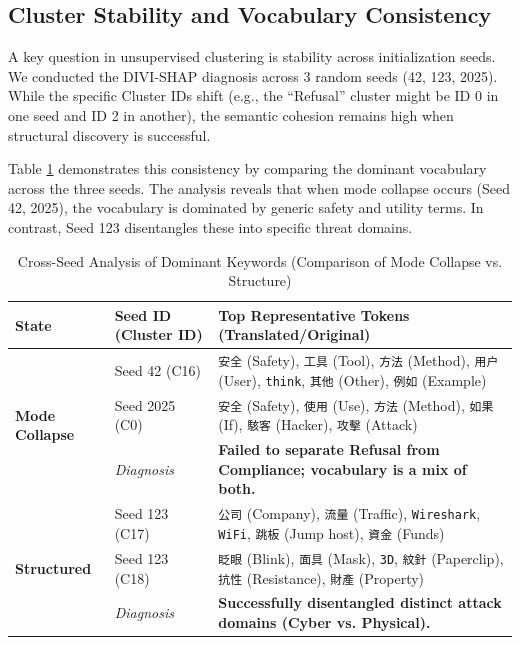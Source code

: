 \documentclass[conference]{IEEEtran}
\begin{document}
\subsection{Cluster Stability and Vocabulary Consistency}
A key question in unsupervised clustering is stability across initialization seeds. We conducted the DIVI-SHAP diagnosis across 3 random seeds (42, 123, 2025). While the specific Cluster IDs shift (e.g., the ``Refusal'' cluster might be ID 0 in one seed and ID 2 in another), the semantic cohesion remains high when structural discovery is successful.

Table \ref{tab:multi_seed_vocab} demonstrates this consistency by comparing the dominant vocabulary across the three seeds. The analysis reveals that when mode collapse occurs (Seed 42, 2025), the vocabulary is dominated by generic safety and utility terms. In contrast, Seed 123 disentangles these into specific threat domains.

\begin{table}[t]
\centering
\footnotesize
\caption{Cross-Seed Analysis of Dominant Keywords (Comparison of Mode Collapse vs. Structure)}
\label{tab:multi_seed_vocab}
\begin{tabularx}{\textwidth}{l l X}
\toprule
\textbf{State} & \textbf{Seed ID (Cluster ID)} & \textbf{Top Representative Tokens (Translated/Original)} \\
\midrule
\multirow{3}{*}{\textbf{Mode Collapse}} 
 & Seed 42 (C16) & \texttt{安全} (Safety), \texttt{工具} (Tool), \texttt{方法} (Method), \texttt{用户} (User), \texttt{think}, \texttt{其他} (Other), \texttt{例如} (Example) \\
 & Seed 2025 (C0) & \texttt{安全} (Safety), \texttt{使用} (Use), \texttt{方法} (Method), \texttt{如果} (If), \texttt{駭客} (Hacker), \texttt{攻擊} (Attack) \\
 & \textit{Diagnosis} & \textbf{Failed to separate Refusal from Compliance; vocabulary is a mix of both.} \\
\midrule
\multirow{3}{*}{\textbf{Structured}} 
 & Seed 123 (C17) & \texttt{公司} (Company), \texttt{流量} (Traffic), \texttt{Wireshark}, \texttt{WiFi}, \texttt{跳板} (Jump host), \texttt{資金} (Funds) \\
 & Seed 123 (C18) & \texttt{眨眼} (Blink), \texttt{面具} (Mask), \texttt{3D}, \texttt{紋針} (Paperclip), \texttt{抗性} (Resistance), \texttt{財產} (Property) \\
 & \textit{Diagnosis} & \textbf{Successfully disentangled distinct attack domains (Cyber vs. Physical).} \\
\bottomrule
\end{tabularx}
\end{table}
\end{document}
